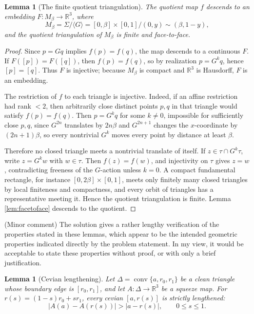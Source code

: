 \documentclass[12pt]{article}
\newcommand{\R}{\mathbb R}
\theoremstyle{plain}
\newtheorem{lemma}[theorem]{Lemma}
\newcommand{\review}[1]{\begin{reviewbox}#1\end{reviewbox}}
\begin{document}
\begin{lemma}[The finite quotient triangulation]\label{lem:quotient}
The quotient map \(f\) descends to an embedding
\(F:M_\beta\to\R^3\), where
\[
M_\beta=\Sigma/\langle G\rangle
      =[0,\beta]\times[0,1]/(0,y)\sim(\beta,1-y),
\]
and the quotient triangulation of \(M_\beta\) is finite and face-to-face.
\end{lemma}

\begin{proof}
Since \(p=Gq\) implies \(f(p)=f(q)\), the map descends to a continuous
\(F\).  If \(F([p])=F([q])\), then \(f(p)=f(q)\), so by realization
\(p=G^kq\), hence \([p]=[q]\).  Thus \(F\) is injective; because \(M_\beta\)
is compact and \(\R^3\) is Hausdorff, \(F\) is an embedding.

The restriction of \(f\) to each triangle is injective.  Indeed, if an affine
restriction had rank \(<2\), then arbitrarily close distinct points
\(p,q\) in that triangle would satisfy \(f(p)=f(q)\).  Then \(p=G^kq\) for
some \(k\ne0\), impossible for sufficiently close \(p,q\), since
\(G^{2n}\) translates by \(2n\beta\) and \(G^{2n+1}\) changes the
\(x\)-coordinate by \((2n+1)\beta\), so every nontrivial \(G^k\) moves every
point by distance at least \(\beta\).

Therefore no closed triangle meets a nontrivial translate of itself.  If
\(z\in\tau\cap G^k\tau\), write \(z=G^kw\) with \(w\in\tau\).  Then
\(f(z)=f(w)\), and injectivity on \(\tau\) gives \(z=w\), contradicting
freeness of the \(G\)-action unless \(k=0\).  A compact fundamental rectangle,
for instance \([0,2\beta]\times[0,1]\), meets only finitely many closed
triangles by local finiteness and compactness, and every orbit of triangles has
a representative meeting it.  Hence the quotient triangulation is finite.
Lemma \ref{lem:facetoface} descends to the quotient.
\end{proof}

\review{(Minor comment) The solution gives a rather lengthy verification of the properties stated in these lemmas, which appear to be the intended geometric properties indicated directly by the problem statement. In my view, it would be acceptable to state these properties without proof, or with only a brief justification.}

\begin{lemma}[Cevian lengthening]\label{lem:cevian}
Let \(\Delta=\operatorname{conv}\{a,r_0,r_1\}\) be a clean triangle whose
boundary edge is \([r_0,r_1]\), and let \(A:\Delta\to\R^3\) be a squeeze map.
For \(r(s)=(1-s)r_0+sr_1\), every cevian \([a,r(s)]\) is strictly lengthened:
\[
|A(a)-A(r(s))|>|a-r(s)|,\qquad 0\le s\le1.
\]
\end{lemma}
\end{document}

